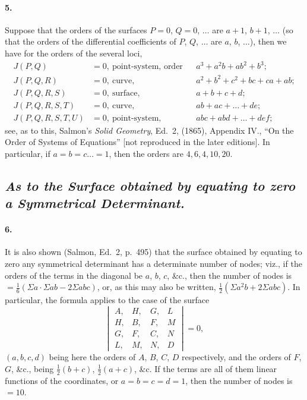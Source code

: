 \documentclass[11pt,a4paper]{article}
\begin{document}
\paragraph{5.}
Suppose that the orders of the surfaces $P = 0$, $Q = 0$, $\ldots$ are $a + 1$, $b + 1$,
$\ldots$ (so that the orders of the differential coefficients of $P$, $Q$, $\ldots$ are
$a$, $b$, $\ldots$), then we have for the orders of the several loci,
\[
\begin{aligned}
J(P, Q) &= 0,\ \text{point-system, order} && a^3 + a^2 b + a b^2 + b^3; \\
J(P, Q, R) &= 0,\ \text{curve,} && a^2 + b^2 + c^2 + bc + ca + ab; \\
J(P, Q, R, S) &= 0,\ \text{surface,} && a + b + c + d; \\
J(P, Q, R, S, T) &= 0,\ \text{curve,} && ab + ac + \ldots + de; \\
J(P, Q, R, S, T, U) &= 0,\ \text{point-system,} && abc + abd + \ldots + def;
\end{aligned}
\]
see, as to this, Salmon's \textit{Solid Geometry}, Ed.\ 2, (1865), Appendix IV., ``On the
Order of Systems of Equations'' [not reproduced in the later editions]. In particular, if
$a = b = c \ldots = 1$, then the orders are $4, 6, 4, 10, 20$.

\subsection*{\textit{As to the Surface obtained by equating to zero a Symmetrical Determinant.}}

\paragraph{6.}
It is also shown (Salmon, Ed.\ 2, p.\ 495) that the surface obtained by equating to zero
any symmetrical determinant has a determinate number of nodes; viz., if the orders of the
terms in the diagonal be $a$, $b$, $c$, \&c., then the number of nodes is
$= \tfrac{1}{6}(\Sigma a \cdot \Sigma a b - 2 \Sigma a b c)$, or, as this may also be
written, $\tfrac{1}{2}(\Sigma a^2 b + 2 \Sigma a b c)$. In particular, the formula applies
to the case of the surface
\[
\begin{vmatrix}
A, & H, & G, & L \\
H, & B, & F, & M \\
G, & F, & C, & N \\
L, & M, & N, & D
\end{vmatrix} = 0,
\]
$(a, b, c, d)$ being here the orders of $A$, $B$, $C$, $D$ respectively, and the orders of
$F$, $G$, \&c., being $\tfrac{1}{2}(b + c)$, $\tfrac{1}{2}(a + c)$, \&c. If the terms are
all of them linear functions of the coordinates, or $a = b = c = d = 1$, then the number of
nodes is $= 10$.
\end{document}
